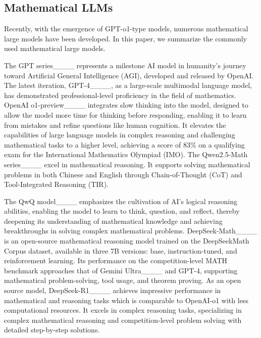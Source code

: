 
\subsection{Mathematical LLMs}
Recently, with the emergence of GPT-o1-type models, numerous mathematical large models have been developed. In this paper, we summarize the commonly used mathematical large models.

The GPT series____ represents a milestone AI model in humanity's journey toward Artificial General Intelligence (AGI), developed and released by OpenAI. The latest iteration, GPT-4____, as a large-scale multimodal language model, has demonstrated professional-level proficiency in the field of mathematics. 
OpenAI o1-preview____ integrates slow thinking into the model, designed to allow the model more time for thinking before responding, enabling it to learn from mistakes and refine questions like human cognition. It elevates the capabilities of large language models in complex reasoning and challenging mathematical tasks to a higher level, achieving a score of 83\% on a qualifying exam for the International Mathematics Olympiad (IMO). The Qwen2.5-Math series____ excel in mathematical reasoning. It supports solving mathematical problems in both Chinese and English through Chain-of-Thought (CoT) and Tool-Integrated Reasoning (TIR). 

The QwQ model____ emphasizes the cultivation of AI's logical reasoning abilities, enabling the model to learn to think, question, and reflect, thereby deepening its understanding of mathematical knowledge and achieving breakthroughs in solving complex mathematical problems. DeepSeek-Math____ is an open-source mathematical reasoning model trained on the DeepSeekMath Corpus dataset, available in three 7B versions: base, instruction-tuned, and reinforcement learning. Its performance on the competition-level MATH benchmark approaches that of Gemini Ultra____ and GPT-4, supporting mathematical problem-solving, tool usage, and theorem proving.
As an open source model, DeepSeek-R1____ achieves impressive performance in mathematical and reasoning tasks which is comparable to OpenAI-o1 with less computational resources. It excels in complex reasoning tasks, specializing in complex mathematical reasoning and competition-level problem solving with detailed step-by-step solutions.

